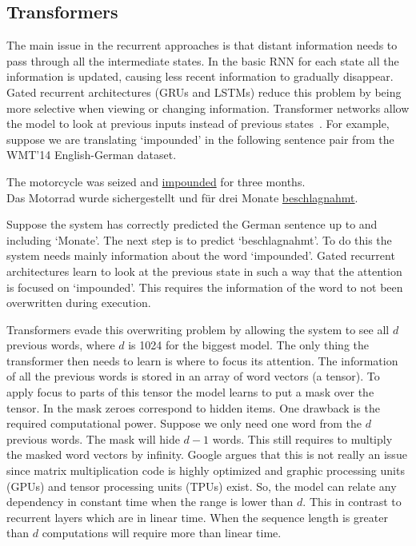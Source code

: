 \subsection{Transformers}
\label{subsec:transformers}
The main issue in the recurrent approaches is that distant information needs to pass through all the intermediate states.
In the basic RNN for each state all the information is updated, causing less recent information to gradually disappear.
Gated recurrent architectures (GRUs and LSTMs) reduce this problem by being more selective when viewing or changing information.
Transformer networks allow the model to look at previous inputs instead of previous states~\citet{vaswani2017attention}.
For example, suppose we are translating `impounded' in the following sentence pair from the WMT'14 English-German dataset.
\begin{center}
    The motorcycle was seized and \underline{impounded} for three months.\\[3mm]
    Das Motorrad wurde sichergestellt und f\"ur drei Monate \underline{beschlagnahmt}.
\end{center}
Suppose the system has correctly predicted the German sentence up to and including `Monate'.
The next step is to predict `beschlagnahmt'.
To do this the system needs mainly information about the word `impounded'.
Gated recurrent architectures learn to look at the previous state in such a way that the attention is focused on `impounded'.
This requires the information of the word to not been overwritten during execution.

Transformers evade this overwriting problem by allowing the system to see all $d$ previous words, where $d$ is 1024 for the biggest model.
The only thing the transformer then needs to learn is where to focus its attention.
The information of all the previous words is stored in an array of word vectors (a tensor).
To apply focus to parts of this tensor the model learns to put a mask over the tensor.
In the mask zeroes correspond to hidden items.
One drawback is the required computational power.
Suppose we only need one word from the $d$ previous words.
The mask will hide $d-1$ words.
This still requires to multiply the masked word vectors by infinity.
Google argues that this is not really an issue since matrix multiplication code is highly optimized and graphic processing units (GPUs) and tensor processing units (TPUs) exist.
So, the model can relate any dependency in constant time when the range is lower than $d$.
This in contrast to recurrent layers which are in linear time.
When the sequence length is greater than $d$ computations will require more than linear time.

